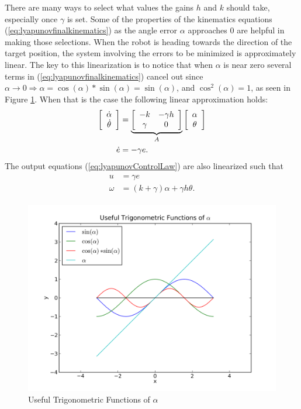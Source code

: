There are many ways to select what values the gains $h$ and $k$ should take, especially once $\gamma$ is set. Some of the properties of the kinematics equations (\ref{eq:lyapunovfinalkinematics}) as the angle error $\alpha$ approaches $0$ are helpful in making those selections. When the robot is heading towards the direction of the target position, the system involving the errors to be minimized is approximately linear. The key to this linearization is to notice that when $\alpha$ is near zero several terms in (\ref{eq:lyapunovfinalkinematics}) cancel out since $\alpha\to0\Rightarrow \alpha=\cos(\alpha)*\sin(\alpha)=\sin(\alpha)$, and $\cos^2(\alpha)=1$, as seen in Figure \ref{fig:plotSinCos}. When that is the case the following linear approximation holds:
\begin{align}
\label{eq:lyapunovLinearSystem}
\begin{split}
\left[\begin{array}{c} \dot{\alpha} \\ \dot{\theta} \end{array}\right]
&= \underbrace{\left[\begin{array}{c c} -k & -\gamma h \\ \gamma & 0 \end{array}\right]}_{A}
\left[\begin{array}{c} \alpha \\ \theta \end{array}\right] \\
\dot{e} &= -\gamma e.
\end{split}
\end{align}
The output equations (\ref{eq:lyapunovControlLaw}) are also linearized such that
\begin{align}
\label{eq:lyapunovLinearOutput}
\begin{split}
u &= \gamma e \\
\omega &= (k+\gamma)\alpha + \gamma h\theta.
\end{split}
\end{align}

\begin{figure}[ht!]
	\centering
	\includegraphics[width=.75\textwidth]{images/plotSinCos}
	\caption{Useful Trigonometric Functions of $\alpha$}
	\label{fig:plotSinCos}
\end{figure}

